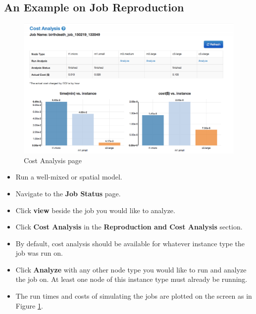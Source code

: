 \subsection{An Example on Job Reproduction}

\begin{figure}[!ht]
\centering
\includegraphics[scale=0.30]{T6/T6_fig_costanalysis.png}
\caption{Cost Analysis page}
\label{fig:cost-analysis}
\end{figure}

\begin{itemize}
\item Run a well-mixed or spatial model.
\item Navigate to the \textbf{Job Status} page.
\item Click \textbf{view} beside the job you would like to analyze.
\item Click \textbf{Cost Analysis} in the \textbf{Reproduction and Cost Analysis} section.
\item By default, cost analysis should be available for whatever instance type the job was run on.
\item Click \textbf{Analyze} with any other node type you would like to run and analyze the job on. At least one node of this instance type must already be running.
\item The run times and costs of simulating the jobs are plotted on the screen as in Figure \ref{fig:cost-analysis}.
\end{itemize}
